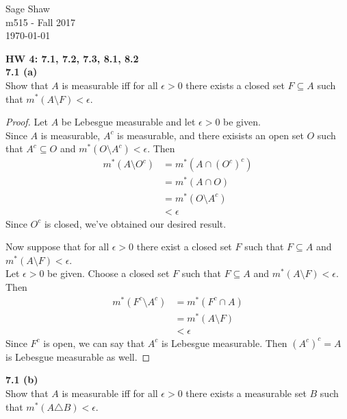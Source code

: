 \documentclass[12pt]{article}
\newcommand{\problem}[1]{\hspace{-4 ex} \large \textbf{#1}\\}
\begin{document}
	\thispagestyle{empty}
	
	\begin{flushright}
		Sage Shaw \\
		m515 - Fall 2017 \\
		\today
	\end{flushright}
	
\large{\textbf{HW 4: 7.1, 7.2, 7.3, 8.1, 8.2}}\\

\problem{7.1 (a)} Show that $A$ is measurable iff for all $\epsilon>0$ there exists a closed set $F\subseteq A$ such that $m^*(A\setminus F)<\epsilon$.

	\begin{proof}
		Let $A$ be Lebesgue measurable and let $\epsilon > 0$ be given. \\
		Since $A$ is measurable, $A^c$ is measurable, and there exisists an open set $O$ such that $A^c \subseteq O$ and $m^*(O \setminus A^c) < \epsilon$. Then 
		\begin{align*}
			m^*(A \setminus O^c) & = m^*(A \cap (O^c)^c) \\
			& = m^*(A \cap O) \\
			& = m^*(O \setminus A^c) \\
			& < \epsilon
		\end{align*}
		Since $O^c$ is closed, we've obtained our desired result. \bigbreak
		
		Now suppose that for all $\epsilon > 0$ there exist a closed set $F$ such that $F \subseteq A$ and $m^*(A \setminus F) < \epsilon$. \\
		Let $\epsilon >0$ be given. Choose a closed set $F$ such that $F \subseteq A$ and $m^*(A \setminus F) < \epsilon$. Then
		\begin{align*}
			m^*(F^c \setminus A^c) & = m^*(F^c \cap A) \\
			& = m^*(A \setminus F) \\
			& < \epsilon
		\end{align*}
		Since $F^c$ is open, we can say that $A^c$ is Lebesgue measurable. Then $(A^c)^c = A$ is Lebesgue measurable as well.		
	\end{proof}

\problem{7.1 (b)} Show that $A$ is measurable iff for all $\epsilon>0$ there exists a measurable set $B$ such that $m^*(A\triangle B)<\epsilon$.
\end{document}
